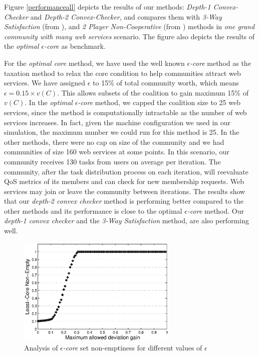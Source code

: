 \documentclass[10pt,journal,cspaper,compsoc]{IEEEtran}
\begin{document}
Figure \ref{performanceall} depicts the results of our methods:
\emph{Depth-1 Convex-Checker} and \emph{Depth-2 Convex-Checker},
and compares them with \emph{3-Way Satisfaction} (from
\cite{DBLP:conf/IEEEscc/LimTMB12}), and \emph{2 Player
Non-Cooperative} (from \cite{DBLP:conf/IEEEscc/KhosravifarABT11})
methods in \emph{one grand community with many web services}
scenario. The figure also depicts the results of the \emph{optimal
$\epsilon$-core} as benchmark.


For the \emph{optimal core} method, we have used the well known
\emph{$\epsilon$-core} method as the taxation method to relax the
core condition to help communities attract web services. We have
assigned $\epsilon$ to 15\% of total community worth, which means
$\epsilon = 0.15 \times v(C)$. This allows subsets of the
coalition to gain maximum 15\% of $v(C)$. In the \emph{optimal
$\epsilon$-core} method, we capped the coalition size to 25 web
services, since the method is computationally intractable as the
number of web services increases. In fact, given the machine
configuration we used in our simulation, the maximum number we
could run for this method is 25. In the other methods, there were
no cap on size of the community and we had communities of size 160
web services at some points. In this scenario, our community
receives 130 tasks from users on average per iteration. The
community, after the task distribution process on each iteration,
will reevaluate QoS metrics of its members and can check for new
membership requests. Web services may join or leave the community
between iterations. The results show that our \emph{depth-2 convex
checker} method is performing better compared to the other methods
and its performance is close to the optimal \emph{$\epsilon$-core}
method. Our \emph{depth-1 convex checker} and the \emph{3-Way
Satisfaction} method, are also performing well.


\begin{figure}[!t]
\centering
\includegraphics[width=3in]{least_core.eps}
\caption{Analysis of \emph{$\epsilon$-core} set non-emptiness for
different values of $\epsilon$} \label{f_leastcore}
\end{figure}
\end{document}
